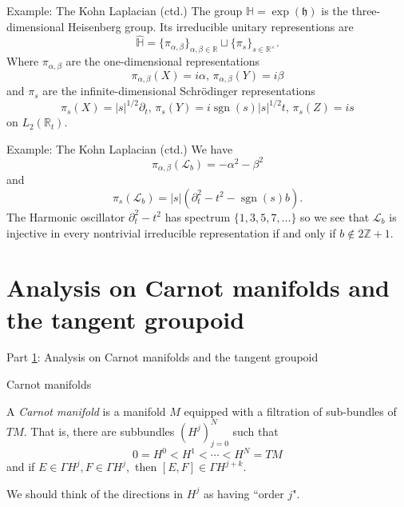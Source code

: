 \documentclass{beamer}
\numberwithin{equation}{section}
\theoremstyle{plain}
\theoremstyle{plain}
\theoremstyle{definition}
\theoremstyle{plain}
\theoremstyle{plain}
\theoremstyle{definition}
\newcommand{\Rl}{\mathbb{R}}
\newcommand{\Itgr}{\mathbb{Z}}
\newcommand{\Lc}{\mathcal{L}}
\newcommand{\sgn}{\operatorname{sgn}}
\begin{document}
\begin{frame}{Example: The Kohn Laplacian (ctd.)}
    The group $\mathbb{H} = \exp(\mathfrak{h})$ is the three-dimensional Heisenberg group. Its irreducible unitary representions are
    \[
        \widehat{\mathbb{H}} = \{\pi_{\alpha,\beta}\}_{\alpha,\beta\in \Rl}\sqcup \{\pi_s\}_{s\in \Rl^{\times}}.
    \]
    Where $\pi_{\alpha,\beta}$ are the one-dimensional representations
    \[
        \pi_{\alpha,\beta}(X) = i\alpha,\, \pi_{\alpha,\beta}(Y) = i\beta
    \]
    and $\pi_s$ are the infinite-dimensional Schr\"odinger representations
    \[
        \pi_s(X) = |s|^{1/2}\partial_t,\, \pi_s(Y) = i\sgn(s)|s|^{1/2}t,\, \pi_s(Z) = is
    \]
    on $L_2(\Rl_t).$
\end{frame}

\begin{frame}{Example: The Kohn Laplacian (ctd.)}
    We have
    \[
        \pi_{\alpha,\beta}(\Lc_b) = -\alpha^2-\beta^2
    \]
    and
    \[
        \pi_{s}(\Lc_b) = |s|(\partial_t^2-t^2-\sgn(s)b).
    \]
    The Harmonic oscillator $\partial_t^2-t^2$ has spectrum $\{1,3,5,7,\ldots\}$ so we see that $\Lc_b$ is injective in every nontrivial irreducible representation if and only if $b\notin 2\Itgr+1.$
\end{frame}

\section{Analysis on Carnot manifolds and the tangent groupoid}\label{Carnot_section}

\begin{frame}
    \Huge{Part \ref{Carnot_section}: Analysis on Carnot manifolds and the tangent groupoid}
\end{frame}

\begin{frame}{Carnot manifolds}
  \begin{definition}
    A \emph{Carnot manifold} is a manifold $M$ equipped with a filtration of sub-bundles of $TM.$ That is, there are subbundles $(H^j)_{j=0}^N$ such that
    \[
      0 = H^0 < H^1 < \cdots < H^N = TM
    \]
    and if $E\in \Gamma H^j, F\in \Gamma H^j,$ then $[E,F] \in \Gamma H^{j+k}.$
  \end{definition}
  We should think of the directions in $H^j$ as having ``order $j$".
\end{frame}
\end{document}
